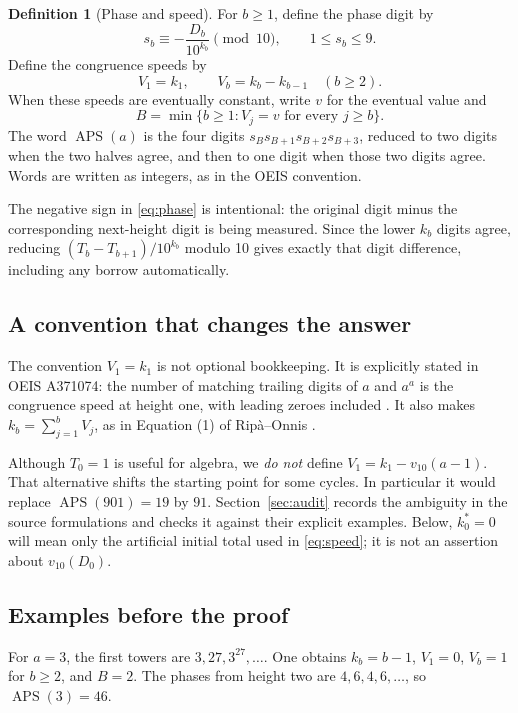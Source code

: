 \documentclass[11pt,letterpaper]{article}
\numberwithin{equation}{section}
\theoremstyle{definition}
\newtheorem{definition}[theorem]{Definition}
\newcommand{\APS}{\operatorname{APS}}
\begin{document}
\begin{definition}[Phase and speed]\label{def:phase}
For $b\geq1$, define the phase digit by
\begin{equation}\label{eq:phase}
 s_b\equiv-\frac{D_b}{10^{k_b}}\pmod {10},\qquad 1\leq s_b\leq9.
\end{equation}
Define the congruence speeds by
\begin{equation}\label{eq:speed}
 V_1=k_1,\qquad V_b=k_b-k_{b-1}\quad(b\geq2).
\end{equation}
When these speeds are eventually constant, write $v$ for the eventual value and
\begin{equation}\label{eq:onsetdef}
 B=\min\{b\geq1:V_j=v\text{ for every }j\geq b\}.
\end{equation}
The word $\APS(a)$ is the four digits $s_Bs_{B+1}s_{B+2}s_{B+3}$, reduced to two
digits when the two halves agree, and then to one digit when those two digits
agree. Words are written as integers, as in the OEIS convention.
\end{definition}

The negative sign in \eqref{eq:phase} is intentional: the original digit minus
the corresponding next-height digit is being measured. Since the lower $k_b$
digits agree, reducing $(T_b-T_{b+1})/10^{k_b}$ modulo 10 gives exactly that
digit difference, including any borrow automatically.

\subsection{A convention that changes the answer}\label{sec:convention}
The convention $V_1=k_1$ is not optional bookkeeping. It is explicitly stated
in OEIS A371074: the number of matching trailing digits of $a$ and $a^a$ is the
congruence speed at height one, with leading zeroes included \cite{oeis1074}.
It also makes $k_b=\sum_{j=1}^b V_j$, as in Equation (1) of
Rip\`a--Onnis \cite{ripaonnis}.

Although $T_0=1$ is useful for algebra, we \emph{do not} define
$V_1=k_1-v_{10}(a-1)$. That alternative shifts the starting point for some
cycles. In particular it would replace $\APS(901)=19$ by $91$.
Section~\ref{sec:audit} records the ambiguity in the source formulations and
checks it against their explicit examples. Below, $k_0^*=0$ will mean only the
artificial initial total used in \eqref{eq:speed}; it is not an assertion about
$v_{10}(D_0)$.

\subsection{Examples before the proof}
For $a=3$, the first towers are $3,27,3^{27},\ldots$. One obtains
$k_b=b-1$, $V_1=0$, $V_b=1$ for $b\geq2$, and $B=2$. The phases from height two
are $4,6,4,6,\ldots$, so $\APS(3)=46$.
\end{document}
